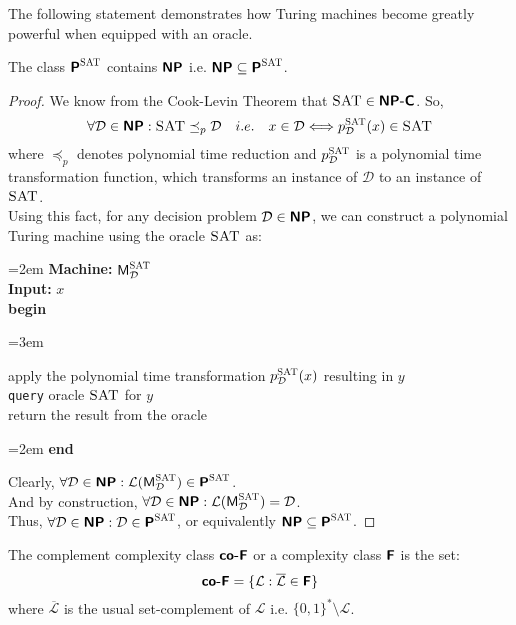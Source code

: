 \documentclass[usletter]{article}
\newcommand{\collection}[1]
           {\ensuremath{\mathcal{#1}}}
\newcommand{\namedcollection}[1]
           {\ensuremath{\textnormal{\textsc{#1}}}}
\newcommand{\machine}[1]
           {\ensuremath{\textnormal{\textsf{#1}}}}
\newcommand{\family}[1]
           {\ensuremath{\textnormal{\textsf{\textbf{#1}}}}}
\newcommand{\term}[1]{\textsf{#1}}
\newcommand{\namethm}[1]{\term{#1} Theorem}
\newenvironment{turing}[2]{
  \par\smallskip\leftskip=2em
  \noindent\ignorespaces
  \textbf{Machine:} #1\\
  \textbf{Input:} #2\\[5pt]
  \textbf{begin}
  \par\leftskip=3em
  \noindent\ignorespaces
}{
  \par\leftskip=2em
  \noindent\ignorespaces
  \textbf{end}
  \par\medskip
}
\begin{document}
\noindent
The following statement demonstrates how Turing machines become greatly powerful when equipped with an oracle.

\begin{proposition}
\label{NP_in_PSAT_proposition}
The class $\family{P}^\namedcollection{SAT}$ contains \family{NP} i.e. $\family{NP} \subseteq \family{P}^\namedcollection{SAT}$.
\end{proposition}

\begin{proof}
We know from the \namethm{Cook-Levin} that $\namedcollection{SAT} \in \family{NP-C}$. So,
$$\forall \collection{D} \in \family{NP} : \namedcollection{SAT} \preceq_p \collection{D} \quad i.e. \quad x \in \collection{D} \Longleftrightarrow p_\collection{D}^\namedcollection{SAT}(x) \in \namedcollection{SAT}$$
where $\preceq_p$ denotes polynomial time reduction and $p_\collection{D}^\namedcollection{SAT}$ is a polynomial time transformation function, which transforms an instance of \collection{D} to an instance of \namedcollection{SAT}. \\

\noindent
Using this fact, for any decision problem $\collection{D} \in \family{NP}$, we can construct a polynomial Turing machine using the oracle \namedcollection{SAT} as:
\begin{turing}{$\machine{M}^\namedcollection{SAT}_\collection{D}$}{$x$}
  apply the polynomial time transformation $p_\collection{D}^\namedcollection{SAT}(x)$ resulting in $y$\\
  \texttt{query} oracle \namedcollection{SAT} for $y$ \\
  return the result from the oracle
\end{turing}

\noindent
Clearly, $\forall \collection{D} \in \family{NP} : \collection{L}(\machine{M}^\namedcollection{SAT}_\collection{D}) \in \family{P}^\namedcollection{SAT}$. \\
And by construction, $\forall \collection{D} \in \family{NP} : \collection{L}(\machine{M}^\namedcollection{SAT}_\collection{D}) = \collection{D}$. \\

\noindent
Thus, $\forall \collection{D} \in \family{NP} : \collection{D} \in \family{P}^\namedcollection{SAT}$, or equivalently $ \family{NP} \subseteq \family{P}^\namedcollection{SAT}$.
\end{proof}

\begin{definition}
The complement complexity class \family{co-F} or a complexity class \family{F} is the set:
$$ \family{co-F} = \{ \collection{L} : \overline{\collection{L}} \in \family{F} \} $$
where $\overline{\collection{L}}$ is the usual set-complement of \collection{L} i.e. $\{0,1\}^* \setminus \collection{L}$.
\end{definition}
\end{document}
